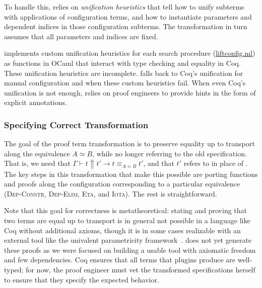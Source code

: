 To handle this, \toolname relies on \textit{unification heuristics} that tell \toolname how to unify subterms with applications of configuration terms, and how to instantiate parameters and dependent indices in those configuration subterms.
The transformation in turn assumes that all parameters and indices are fixed.

\toolname implements custom unification heuristics for each search procedure (\href{https://github.com/uwplse/pumpkin-pi/blob/master/plugin/src/automation/lift/liftconfig.ml}{liftconfig.ml}) as functions in OCaml that interact with type checking and equality in Coq.
These unification heuristics are incomplete.
\toolname falls back to Coq's unification for manual configuration and when these custom heuristics fail.
When even Coq's unification is not enough, \toolname relies on proof engineers to provide hints
in the form of explicit annotations.

\subsubsection{Specifying Correct Transformation}
\label{sec:transfspecif}

The goal of the proof term transformation is to preserve equality up to transport along the equivalence $A \simeq B$,
while no longer referring to the old specification.
That is, we need that $\Gamma \vdash t \Uparrow t' \rightarrow t \equiv_{A \simeq B} t'$, and that $t'$ refers to \B in place of \A.
The key steps in this transformation that make this possible are porting functions and proofs along the configuration corresponding
to a particular equivalence (\textsc{Dep-Constr}, \textsc{Dep-Elim}, \textsc{Eta}, and \textsc{Iota}).
The rest is straightforward.

Note that this goal for correctness is metatheoretical:
stating and proving that two terms are equal up to transport is in general not possible in a language like Coq
without additional axioms, though it is in some cases realizable with an external tool like the
univalent parametricity framework~\cite{tabareau2017equivalences}.
\toolname does not yet generate these proofs as we were focused on building a usable tool with axiomatic freedom and few dependencies.
Coq ensures that all terms that plugins produce are well-typed; for now, %
the proof engineer must vet the transformed specifications herself to ensure that they specify the expected behavior.

